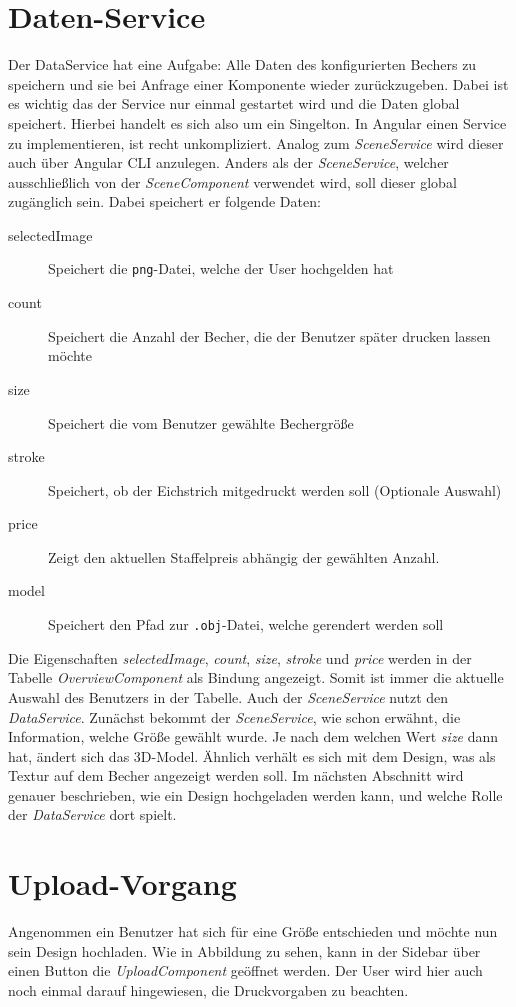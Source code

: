 \section{Daten-Service}
\label{sec:umsetzung}
%
Der DataService hat eine Aufgabe: Alle Daten des konfigurierten Bechers zu speichern und sie bei Anfrage einer Komponente wieder zurückzugeben. Dabei ist es wichtig das der Service nur einmal gestartet wird und die Daten global speichert. Hierbei handelt es sich also um ein Singelton. In Angular einen Service zu implementieren, ist recht unkompliziert. Analog zum \textit{SceneService} wird dieser auch über Angular CLI anzulegen. Anders als der \textit{SceneService}, welcher ausschließlich von der \textit{SceneComponent} verwendet wird, soll dieser global zugänglich sein. Dabei speichert er folgende Daten:
\begin{description}
	\item[selectedImage] Speichert die \texttt{png}-Datei, welche der User hochgelden hat
	\item[count] Speichert die Anzahl der Becher, die der Benutzer später drucken lassen möchte 
	\item[size] Speichert die vom Benutzer gewählte Bechergröße
	\item[stroke] Speichert, ob der Eichstrich mitgedruckt werden soll (Optionale Auswahl)
	\item[price] Zeigt den aktuellen Staffelpreis abhängig der gewählten Anzahl.
	\item[model] Speichert den Pfad zur \texttt{.obj}-Datei, welche gerendert werden soll
\end{description}
%
Die Eigenschaften \textit{selectedImage}, \textit{count}, \textit{size}, \textit{stroke} und \textit{price} werden in der Tabelle \textit{OverviewComponent} als Bindung angezeigt. Somit ist immer die aktuelle Auswahl des Benutzers in der Tabelle. Auch der \textit{SceneService} nutzt den \textit{DataService}. Zunächst bekommt der \textit{SceneService}, wie schon erwähnt, die Information, welche Größe gewählt wurde. Je nach dem welchen Wert \textit{size} dann hat, ändert sich das 3D-Model. Ähnlich verhält es sich mit dem Design, was als Textur auf dem Becher angezeigt werden soll. Im nächsten Abschnitt wird genauer beschrieben, wie ein Design hochgeladen werden kann, und welche Rolle der \textit{DataService} dort spielt.
%
\section{Upload-Vorgang}
\label{sec:umsetzung}
%
Angenommen ein Benutzer hat sich für eine Größe entschieden und möchte nun sein Design hochladen. Wie in Abbildung zu sehen, kann in der Sidebar über einen Button die \textit{UploadComponent} geöffnet werden. Der User wird hier auch noch einmal darauf hingewiesen, die Druckvorgaben zu beachten.
